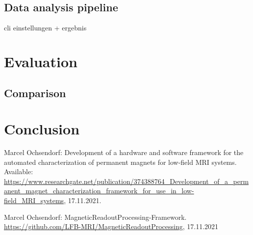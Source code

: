 \documentclass[conference]{IEEEtran}
\begin{document}
\subsection{Data analysis pipeline}





cli einstellungen
+ ergebnis








\section{Evaluation}

\subsection{Comparison}


\section{Conclusion}


\begingroup
\begin{thebibliography}{00}
 Marcel Ochsendorf: Development of a hardware and software framework for the automated characterization of permanent magnets for low-field MRI systems. Available: \url{https://www.researchgate.net/publication/374388764_Development_of_a_permanent_magnet_characterization_framework_for_use_in_low-field_MRI_systems}, 17.11.2021.

\vskip 0.05in
 Marcel Ochsendorf: MagneticReadoutProcessing-Framework. \url{https://github.com/LFB-MRI/MagneticReadoutProcessing}, 17.11.2021


\end{thebibliography}
\endgroup
\end{document}
